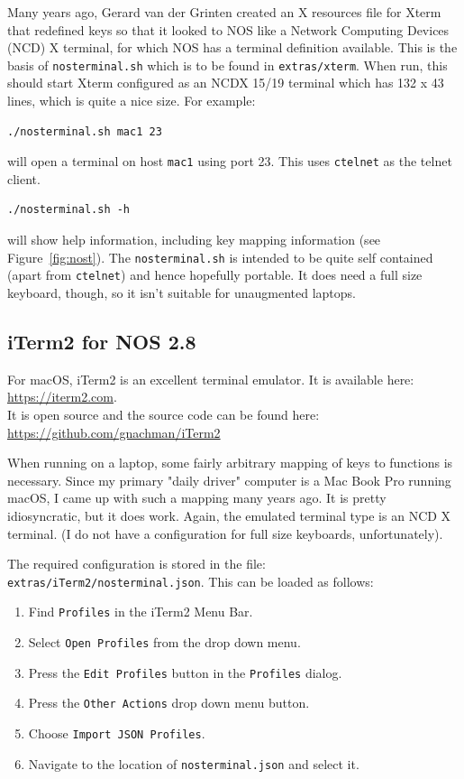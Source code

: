 \documentclass[a4paper,twoside,11pt]{article}
\newcommand{\newpara}{\par\vspace{4mm}\noindent}
\begin{document}
\newpara
Many years ago, Gerard van der Grinten created an X resources file for Xterm that redefined keys so that it looked to NOS like a Network Computing Devices (NCD) X terminal, for which NOS has a terminal definition available. This is the basis of \texttt{nosterminal.sh} which is to be found in
\texttt{extras/xterm}. When run, this should start Xterm configured as an NCDX 15/19 terminal which has 132 x 43 lines, which is quite a nice
size. For example:
\begin{verbatim}
./nosterminal.sh mac1 23
\end{verbatim}
will open a terminal on host \texttt{mac1} using port 23. This uses \texttt{ctelnet} as the telnet client.
\begin{verbatim}
./nosterminal.sh -h
\end{verbatim}
will show help information, including key mapping information (see Figure~\ref{fig:nost}).
The \texttt{nosterminal.sh} is intended to be quite self contained (apart from \texttt{ctelnet}) and hence hopefully portable.
It does need a full size keyboard, though, so it isn't suitable for unaugmented laptops.

\subsection{iTerm2 for NOS 2.8}
For macOS, iTerm2 is an excellent terminal emulator. It is available here:\\
\url{https://iterm2.com}.\\
It is open source and the source code can be found here:\\
\url{https://github.com/gnachman/iTerm2}

\newpara
When running on a laptop, some fairly arbitrary mapping of keys to functions is necessary.
Since my primary "daily driver" computer is a Mac Book Pro running macOS, I came up with such a mapping many years ago. It is pretty
idiosyncratic, but it does work. Again, the emulated terminal type is an NCD X terminal. (I do not have a configuration for
full size keyboards, unfortunately).

\newpara
The required configuration is stored in the file: \texttt{extras/iTerm2/nosterminal.json}. This can be loaded as follows:
\begin{enumerate}
\item Find \texttt{Profiles} in the iTerm2 Menu Bar.
\item Select \texttt{Open Profiles} from the drop down menu.
\item Press the \texttt{Edit Profiles} button in the \texttt{Profiles} dialog.
\item Press the \texttt{Other Actions} drop down menu button.
\item Choose \texttt{Import JSON Profiles}.
\item Navigate to the location of \texttt{nosterminal.json} and select it.
\end{enumerate}
\end{document}
